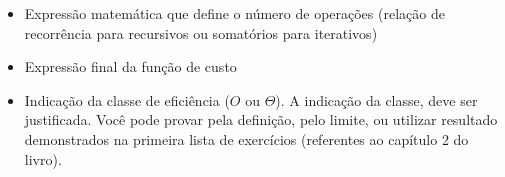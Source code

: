 \documentclass{article}
\begin{document}
\begin{itemize}
    \item Expressão matemática que define o número de operações (relação de recorrência para recursivos ou somatórios para iterativos) 
    \item Expressão final da função de custo
    \item Indicação da classe de eficiência ($O$ ou $\Theta$). A indicação da classe, deve ser justificada. Você pode provar pela definição, pelo limite, ou utilizar resultado demonstrados na primeira lista de exercícios (referentes ao capítulo 2 do livro).
\end{itemize}




%
%
\end{document}
